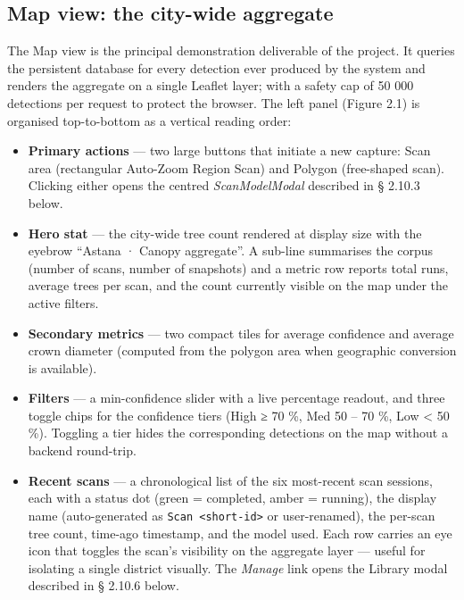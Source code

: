 \subsection{Map view: the city-wide aggregate}\label{map-view-the-city-wide-aggregate}

The Map view is the principal demonstration deliverable of the project. It queries the persistent database for every detection ever produced by the system and renders the aggregate on a single Leaflet layer; with a safety cap of 50 000 detections per request to protect the browser. The left panel (Figure 2.1) is organised top-to-bottom as a vertical reading order:

\begin{itemize}
\tightlist
\item
  \textbf{Primary actions} --- two large buttons that initiate a new capture: Scan area (rectangular Auto-Zoom Region Scan) and Polygon (free-shaped scan). Clicking either opens the centred \emph{ScanModelModal} described in § 2.10.3 below.
\item
  \textbf{Hero stat} --- the city-wide tree count rendered at display size with the eyebrow ``Astana · Canopy aggregate''. A sub-line summarises the corpus (number of scans, number of snapshots) and a metric row reports total runs, average trees per scan, and the count currently visible on the map under the active filters.
\item
  \textbf{Secondary metrics} --- two compact tiles for average confidence and average crown diameter (computed from the polygon area when geographic conversion is available).
\item
  \textbf{Filters} --- a min-confidence slider with a live percentage readout, and three toggle chips for the confidence tiers (High ≥ 70 \%, Med 50 -- 70 \%, Low \textless{} 50 \%). Toggling a tier hides the corresponding detections on the map without a backend round-trip.
\item
  \textbf{Recent scans} --- a chronological list of the six most-recent scan sessions, each with a status dot (green = completed, amber = running), the display name (auto-generated as \texttt{Scan\ \textless{}short-id\textgreater{}} or user-renamed), the per-scan tree count, time-ago timestamp, and the model used. Each row carries an eye icon that toggles the scan's visibility on the aggregate layer --- useful for isolating a single district visually. The \emph{Manage} link opens the Library modal described in § 2.10.6 below.
\end{itemize}

